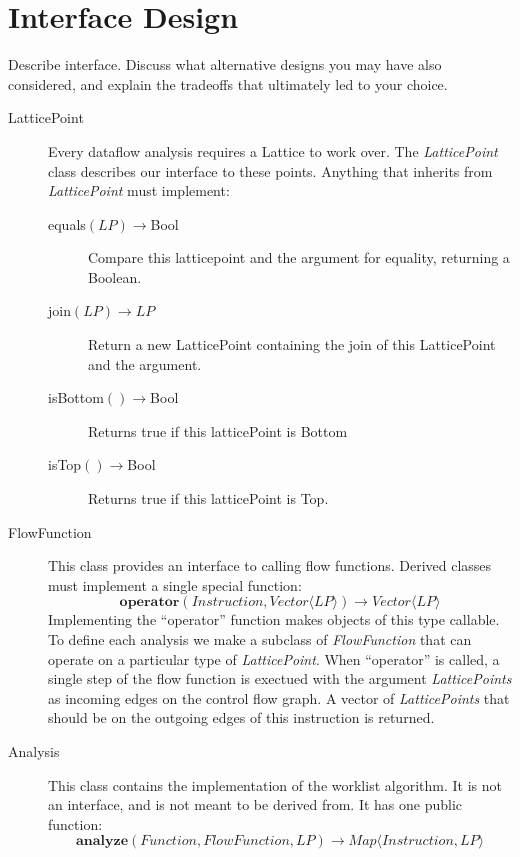 \documentclass{article}
\theoremstyle{definition}
\begin{document}
\section{Interface Design}
\begin{framed}
  Describe interface. Discuss what alternative designs you may have
  also considered, and explain the tradeoffs that ultimately led to
  your choice.
\end{framed}


\begin{description}
\item[LatticePoint] Every dataflow analysis requires a Lattice to work
  over. The \emph{LatticePoint} class describes our interface to these
  points. Anything that inherits from \emph{LatticePoint} must
  implement:
  \begin{description}
  \item[equals$(LP) \rightarrow $Bool] Compare this latticepoint and
    the argument for equality, returning a Boolean.
  \item[join$(LP) \rightarrow LP$] Return a new LatticePoint
    containing the join of this LatticePoint and the argument.
  \item[isBottom$() \rightarrow $Bool] Returns true if this
    latticePoint is Bottom
  \item[isTop$() \rightarrow $Bool] Returns true if this latticePoint
    is Top.
  \end{description}
\item[FlowFunction] This class provides an interface to calling flow
  functions. Derived classes must implement a single special function:
  \[
  \textbf{operator}(Instruction, Vector \langle LP\rangle) \rightarrow
  Vector \langle LP \rangle
  \]
  Implementing the ``operator'' function makes objects of this type
  callable. To define each analysis we make a subclass of
  \emph{FlowFunction} that can operate on a particular type of
  \emph{LatticePoint}. When ``operator'' is called, a single step of
  the flow function is exectued with the argument \emph{LatticePoints}
  as incoming edges on the control flow graph. A vector of
  \emph{LatticePoints} that should be on the outgoing edges of this
  instruction is returned.
\item[Analysis] This class contains the implementation of the worklist
  algorithm. It is not an interface, and is not meant to be derived
  from. It has one public function:
  \[
  \textbf{analyze}(Function, FlowFunction, LP) \rightarrow
  Map \langle Instruction, LP \rangle
  \]
\end{description}
\end{document}
